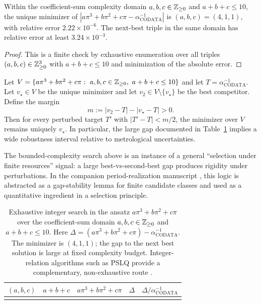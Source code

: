 \begin{proposition}
\label{prop:alpha_integer_rigidity}
Within the coefficient-sum complexity domain $a,b,c\in\mathbb{Z}_{\ge 0}$ and $a+b+c\le 10$, the unique minimizer of $|a\pi^3+b\pi^2+c\pi-\alpha_{\mathrm{CODATA}}^{-1}|$ is $(a,b,c)=(4,1,1)$, with relative error $2.22\times 10^{-6}$. The next-best triple in the same domain has relative error at least $3.24\times 10^{-3}$.
\end{proposition}
\begin{proof}
This is a finite check by exhaustive enumeration over all triples $(a,b,c)\in\mathbb{Z}_{\ge 0}^3$ with $a+b+c\le 10$ and minimization of the absolute error.
\end{proof}

\begin{corollary}
\label{cor:alpha_integer_rigidity_gap_robustness}
Let $V=\{a\pi^3+b\pi^2+c\pi:\ a,b,c\in\ZZ_{\ge 0},\ a+b+c\le 10\}$ and let $T=\alpha_{\mathrm{CODATA}}^{-1}$. Let $v_\star\in V$ be the unique minimizer and let $v_2\in V\setminus\{v_\star\}$ be the best competitor. Define the margin
\[
m:=|v_2-T|-|v_\star-T|>0.
\]
Then for every perturbed target $T'$ with $|T'-T|<m/2$, the minimizer over $V$ remains uniquely $v_\star$. In particular, the large gap documented in Table~\ref{tab:alpha_integer_search} implies a wide robustness interval relative to metrological uncertainties.
\end{corollary}

\begin{remark}
The bounded-complexity search above is an instance of a general ``selection under finite resources'' signal: a large best-vs-second-best gap produces rigidity under perturbations. In the companion period-realization manuscript \cite{Ma2025MAI}, this logic is abstracted as a gap-stability lemma for finite candidate classes and used as a quantitative ingredient in a selection principle.
\end{remark}

\begin{table}[t]
\centering
\begin{tabular}{@{}rrrrr@{}}
\toprule
$(a,b,c)$ & $a+b+c$ & $a\pi^3+b\pi^2+c\pi$ & $\Delta$ & $\Delta/\alpha_{\mathrm{CODATA}}^{-1}$ \\
\midrule
%
\\
\bottomrule
\end{tabular}
\caption{Exhaustive integer search in the ansatz $a\pi^3+b\pi^2+c\pi$ over the coefficient-sum domain $a,b,c\in\mathbb{Z}_{\ge 0}$ and $a+b+c\le 10$. Here $\Delta=(a\pi^3+b\pi^2+c\pi)-\alpha_{\mathrm{CODATA}}^{-1}$. The minimizer is $(4,1,1)$; the gap to the next best solution is large at fixed complexity budget. Integer-relation algorithms such as PSLQ provide a complementary, non-exhaustive route \cite{FergusonBaileyArno1999}.}
\label{tab:alpha_integer_search}
\end{table}

